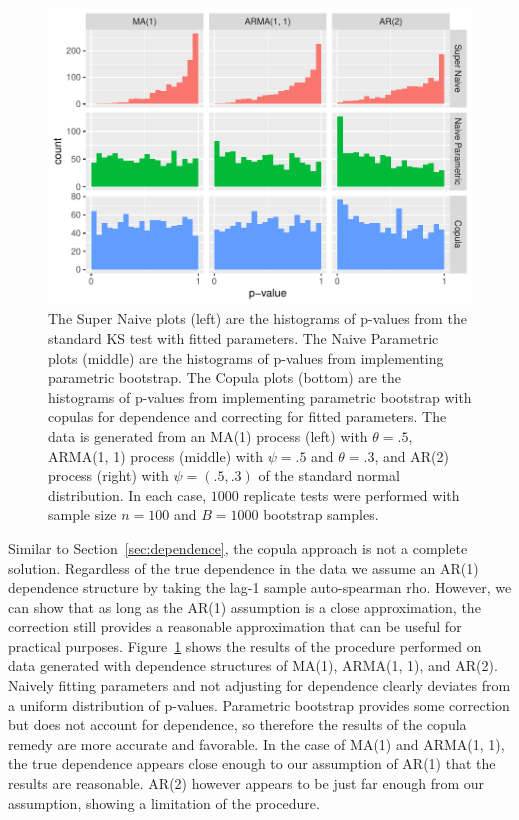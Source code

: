 \documentclass[12pt, letterpaper, titlepage]{article}
\begin{document}
\begin{figure}[tbp]
  \centering
  \includegraphics[width=\textwidth]{hist_ma1_arma_ar2_FD}
  \caption{The Super Naive plots (left) are the histograms of p-values from the
  standard KS test with fitted parameters. The Naive Parametric plots (middle)
  are the histograms of p-values from implementing parametric bootstrap. The
  Copula plots (bottom) are the histograms of p-values from implementing
  parametric bootstrap with copulas for dependence and correcting for fitted
  parameters. The data is generated from an MA(1) process (left) with
  $\theta = .5$, ARMA(1, 1) process (middle) with $\psi = .5$ and $\theta = .3$,
  and AR(2) process (right) with $\psi = (.5, .3)$ of the standard normal
  distribution. In each case, $1000$ replicate tests were performed with sample
  size $n = 100$ and $B = 1000$ bootstrap samples.}
  \label{fig:hist_ma1_arma_ar2_FD}
\end{figure}

Similar to Section~\ref{sec:dependence}, the copula approach is not a complete
solution. Regardless of the true dependence in the data we assume an AR(1)
dependence structure by taking the lag-1 sample auto-spearman rho. However, we
can show that as long as the AR(1) assumption is a close approximation, the
correction still provides a reasonable approximation that can be useful for
practical purposes. Figure~\ref{fig:hist_ma1_arma_ar2_FD} shows the results of the
procedure performed on data generated with dependence structures of  MA(1),
ARMA(1, 1), and AR(2). Naively fitting parameters and not adjusting for
dependence clearly deviates from a uniform distribution of p-values. Parametric
bootstrap provides some correction but does not account for dependence, so
therefore the results of the copula remedy are more accurate and favorable.
In the case of MA(1) and ARMA(1, 1), the true dependence appears close enough
to our assumption of AR(1) that the results are reasonable. AR(2) however
appears to be just far enough from our assumption, showing a limitation of the
procedure.
\end{document}
